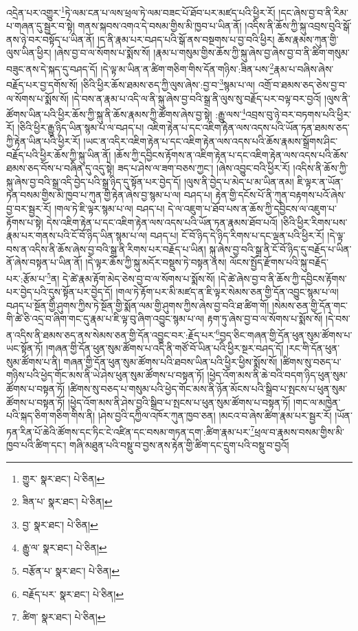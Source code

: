 འདྲེན་པར་འགྱུར་\footnote{གྱུར་  སྣར་ཐང་།  པེ་ཅིན། }ཏེ་ལམ་ངན་པ་ལས་ཕྲལ་ཏེ་ལམ་བཟང་པོ་ཐོབ་པར་མཛད་པའི་ཕྱིར་རོ། །དང་ཞེས་བྱ་བ་ནི་རིམ་པ་གཞན་དུ་སྦྱར་བ་སྟེ། གནས་སྐབས་འགའ་དེ་བསམ་གྱིས་མི་ཁྱབ་པ་ཡིན་ནོ། །འདིས་ནི་ཆོས་ཀྱི་སྐུ་འབྲས་བུའི་སྒོ་ནས་ཉེ་བར་བསྟོད་པ་ཡིན་ནོ། །ད་ནི་རྣམ་པར་བཤད་པའི་སྒོ་ནས་བསྔགས་པ་བྱ་བའི་ཕྱིར། ཆོས་རྣམས་ཀུན་གྱི་ལུས་ཡིན་ཕྱིར། །ཞེས་བྱ་བ་ལ་སོགས་པ་སྨོས་སོ། །རྣམ་པ་གསུམ་གྱིས་ཆོས་ཀྱི་སྐུ་ཞེས་བྱ་ཞེས་བྱ་བ་ནི་ཚིག་གསུམ་བཟུང་ནས་དེ་སྐད་དུ་བཤད་དོ། །དེ་ལྟ་མ་ཡིན་ན་ཚིག་གཅིག་གིས་དོན་གཉིས་:ཟིན་པས་\footnote{ཟིན་པ་  སྣར་ཐང་།  པེ་ཅིན། }རྣམ་པ་བཞིས་ཞེས་བརྗོད་པར་བྱ་དགོས་སོ། །ཅིའི་ཕྱིར་ཆོས་ཐམས་ཅད་ཀྱི་ལུས་ཞེས་:བྱ་བ་\footnote{བྱ་  སྣར་ཐང་།  པེ་ཅིན། }སྙམ་པ་ལ། འགྲོ་བ་ཐམས་ཅད་ཅེས་བྱ་བ་ལ་སོགས་པ་སྨོས་སོ། །དེ་བས་ན་རྣམ་པ་འདི་ལ་ནི་སྐུ་ཞེས་བྱ་བའི་སྒྲ་ནི་ལུས་སུ་བརྗོད་པར་བལྟ་བར་བྱའོ། །ལུས་ནི་ཚོགས་ཡིན་པའི་ཕྱིར་ཆོས་ཀྱི་སྐུ་ནི་ཆོས་རྣམས་ཀྱི་ཚོགས་ཞེས་བྱ་སྟེ། :རྒྱུ་ལས་\footnote{རྒྱུ་ལ་  སྣར་ཐང་།  པེ་ཅིན། }འབྲས་བུ་ཉེ་བར་བཏགས་པའི་ཕྱིར་རོ། །ཅིའི་ཕྱིར་རྒྱུ་ཉིད་ཡིན་སྙམ་པ་ལ་བཤད་པ། འཇིག་རྟེན་པ་དང་འཇིག་རྟེན་ལས་འདས་པའི་ཡོན་ཏན་ཐམས་ཅད་ཀྱི་རྟེན་ཡིན་པའི་ཕྱིར་རོ། །ཡང་ན་འདིར་འཇིག་རྟེན་པ་དང་འཇིག་རྟེན་ལས་འདས་པའི་ཆོས་རྣམས་སྒྲོགས་ཤིང་བརྗོད་པའི་ཕྱིར་ཆོས་ཀྱི་སྐུ་ཡིན་ནོ། །ཆོས་ཀྱི་དབྱིངས་རྟོགས་ན་འཇིག་རྟེན་པ་དང་འཇིག་རྟེན་ལས་འདས་པའི་ཆོས་ཐམས་ཅད་བོས་པ་བཞིན་དུ་འདུ་སྟེ། ཟད་པ་ཤེས་ལ་ཟག་བཅས་ཀྱང་། །ཞེས་འབྱུང་བའི་ཕྱིར་རོ། །འདིས་ནི་ཆོས་ཀྱི་སྐུ་ཞེས་བྱ་བའི་སྒྲ་འདི་བྱེད་པའི་སྒྲ་ཉིད་དུ་སྟོན་པར་བྱེད་དོ། །ལུས་ནི་བྱེད་པ་མེད་པ་མ་ཡིན་ནམ། ཇི་ལྟར་ན་ཡོན་ཏན་བསམ་གྱིས་མི་ཁྱབ་པ་ཀུན་གྱི་རྟེན་ཞེས་བྱ་སྙམ་པ་ལ། བཤད་པ། རྟེན་གྱི་དངོས་པོ་ནི་ཀུན་བརྟགས་པའོ་ཞེས་བྱ་བར་སྦྱར་རོ། །གལ་ཏེ་ཇི་ལྟར་སྙམ་པ་ལ། བཤད་པ། དེ་ལ་འཇུག་པ་ཐོབ་པས་ན་ཆོས་ཀྱི་དབྱིངས་ལ་འཇུག་པ་རྟོགས་པ་སྟེ། དེས་འཇིག་རྟེན་པ་དང་འཇིག་རྟེན་ལས་འདས་པའི་ཡོན་ཏན་རྣམས་ཐོབ་པའོ། །ཅིའི་ཕྱིར་རིགས་པས་རྣམ་པར་གནས་པའི་ངོ་བོ་ཉིད་ཡིན་སྙམ་པ་ལ། བཤད་པ། ངོ་བོ་ཉིད་དེ་ཉིད་རིགས་པ་དང་ལྡན་པའི་ཕྱིར་རོ། །དེ་ལྟ་བས་ན་འདིས་ནི་ཆོས་ཞེས་བྱ་བའི་སྒྲ་ནི་རིགས་པར་བརྗོད་པ་ཡིན། སྐུ་ཞེས་བྱ་བའི་སྒྲ་ནི་ངོ་བོ་ཉིད་དུ་བརྗོད་པ་ཡིན་ནོ་ཞེས་བསྟན་པ་ཡིན་ནོ། །དེ་ལྟར་ཆོས་ཀྱི་སྐུ་མདོར་བསྡུས་ཏེ་བསྟན་ནས། ལོངས་སྤྱོད་རྫོགས་པའི་སྐུ་བརྗོད་པར་:རྩོམ་པ་\footnote{བརྩོན་པ་  སྣར་ཐང་།  པེ་ཅིན། }ན། དེ་ཚེ་རྣམ་རྟོག་མེད་ཅེས་བྱ་བ་ལ་སོགས་པ་སྨོས་སོ། །དེ་ཚེ་ཞེས་བྱ་བ་ནི་ཆོས་ཀྱི་དབྱིངས་རྟོགས་པར་བྱེད་པའི་དུས་སྟོན་པར་བྱེད་དོ། །གལ་ཏེ་རྟོག་པར་མི་མཛད་ན་ཇི་ལྟར་སེམས་ཅན་གྱི་དོན་འབྱུང་སྙམ་པ་ལ། བཤད་པ་སྔོན་གྱི་ཤུགས་ཀྱིས་ཏེ་སྔོན་གྱི་སྨོན་ལམ་གྱི་ཤུགས་ཀྱིས་ཞེས་བྱ་བའི་ཐ་ཚིག་གོ། །སེམས་ཅན་གྱི་དོན་གང་གི་ཚེ་ཅི་འདྲ་བ་ཞིག་གང་དུ་རྣམ་པ་ཇི་ལྟ་བུ་ཞིག་འབྱུང་སྙམ་པ་ལ། རྟག་ཏུ་ཞེས་བྱ་བ་ལ་སོགས་པ་སྨོས་སོ། །དེ་བས་ན་འདིས་ནི་ཐམས་ཅད་ནས་སེམས་ཅན་གྱི་དོན་འབྱུང་བར་:རྗོད་པར་\footnote{བརྗོད་པར་  སྣར་ཐང་།  པེ་ཅིན། }བྱད་ཅིང་གཞན་གྱི་དོན་ཕུན་སུམ་ཚོགས་པ་ཡང་སྟོན་ཏོ། །གཞན་གྱི་དོན་ཕུན་སུམ་ཚོགས་པ་འདི་ནི་གཙོ་བོ་ཡིན་པའི་ཕྱིར་སྔར་བཤད་དོ། །རང་གི་དོན་ཕུན་སུམ་ཚོགས་པ་ནི། གཞན་གྱི་དོན་ཕུན་སུམ་ཚོགས་པའི་ཐབས་ཡིན་པའི་ཕྱིར་ཕྱིས་སྨོས་སོ། །ཚིགས་སུ་བཅད་པ་གཉིས་པའི་ཕྱེད་གོང་མས་ནི་ཡེ་ཤེས་ཕུན་སུམ་ཚོགས་པ་བསྟན་ཏོ། །ཕྱེད་འོག་མས་ནི་ཆེ་བའི་བདག་ཉིད་ཕུན་སུམ་ཚོགས་པ་བསྟན་ཏོ། །ཚིགས་སུ་བཅད་པ་གསུམ་པའི་ཕྱེད་གོང་མས་ནི་ཉོན་མོངས་པའི་སྒྲིབ་པ་སྤངས་པ་ཕུན་སུམ་ཚོགས་པ་བསྟན་ཏོ། །ཕྱེད་འོག་མས་ནི་ཤེས་བྱའི་སྒྲིབ་པ་སྤངས་པ་ཕུན་སུམ་ཚོགས་པ་བསྟན་ཏོ། །གང་ལ་མཁྱེན་པའི་སྐད་ཅིག་གཅིག་གིས་ནི། །ཤེས་བྱའི་དཀྱིལ་འཁོར་ཀུན་ཁྱབ་ཅན། །མངའ་བ་ཞེས་ཚིག་རྣམ་པར་སྦྱར་རོ། །ཡོན་ཏན་རིན་པོ་ཆེའི་ཚོགས་དང་ཏིང་ངེ་འཛིན་དང་བསམ་གཏན་དག་:ཚིག་རྣམ་པར་\footnote{ཚིག་  སྣར་ཐང་།  པེ་ཅིན། }ཕྲལ་བ་རྣམས་བསམ་གྱིས་མི་ཁྱབ་པའི་ཚིག་དང་། གཞི་མཐུན་པའི་བསྡུ་བ་བྱས་ནས་རྟེན་གྱི་ཚིག་དང་དྲུག་པའི་བསྡུ་བ་བྱའོ། 